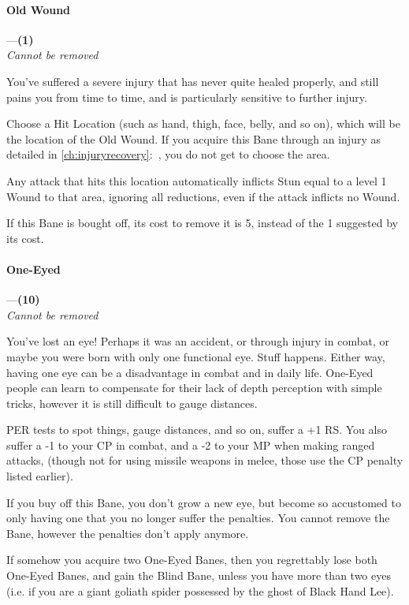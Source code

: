 \documentclass[oneside,11pt,english]{book}
\begin{document}
\paragraph{\label{bane:Old Wound}Old Wound}---\quad\textbf{(1) }\\
\emph{Cannot be removed}\par
You've suffered a severe injury that has never quite healed properly, and still pains you from time to time, and is particularly sensitive to further injury. 


Choose a Hit Location (such as hand, thigh, face, belly, and so on), which will be the location of the Old Wound. If you acquire this Bane through an injury as detailed in \autoref{ch:injuryrecovery}:~, you do not get to choose the area.


Any attack that hits this location automatically inflicts Stun equal to a level 1 Wound to that area, ignoring all reductions, even if the attack inflicts no Wound.


If this Bane is bought off, its cost to remove it is 5, instead of the 1 suggested by its cost. 
\paragraph{\label{bane:One-Eyed}One-Eyed}---\quad\textbf{(10) }\\
\emph{Cannot be removed}\par
You've lost an eye! Perhaps it was an accident, or through injury in combat, or
maybe you were born with only one functional eye. Stuff happens. Either way,
having one eye can be a disadvantage in combat and in daily life. One-Eyed
people can learn to compensate for their lack of depth perception with simple
tricks, however it is still difficult to gauge distances. 

PER tests to spot things, gauge distances, and so on, suffer a +1 RS. You also
suffer a -1 to your CP in combat, and a -2 to your MP when making ranged
attacks, (though not for using missile weapons in melee, those use the CP
penalty listed earlier). 

If you buy off this Bane, you don't grow a new eye, but become so accustomed to
only having one that you no longer suffer the penalties. You cannot remove the
Bane, however the penalties don't apply anymore. 

If somehow you acquire two One-Eyed Banes, then you regrettably lose both
One-Eyed Banes, and gain the Blind Bane, unless you have more than two eyes
(i.e. if you are a giant goliath spider possessed by the ghost of Black Hand
Lee). 
\end{document}
